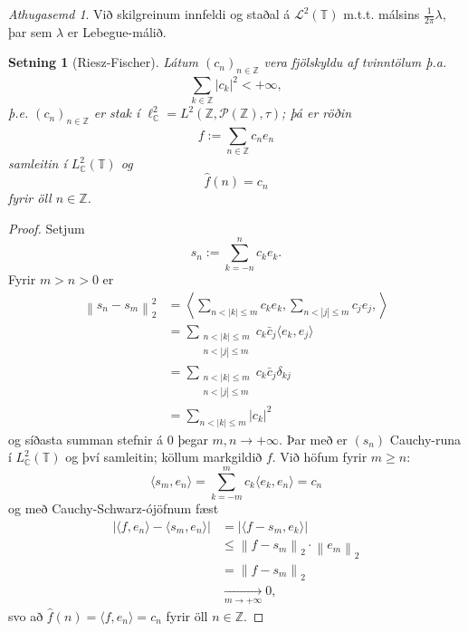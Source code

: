 \documentclass[a4paper,icelandic,11pt]{book}
\theoremstyle{plain}      \newtheorem{setn}{Setning}[chapter]
\theoremstyle{definition} \newtheorem{skilgr}[setn]{Skilgreining}
\theoremstyle{remark}     \newtheorem*{ath}{Athugasemd}
\newcommand{\C}{\mathbb C}
\newcommand{\Z}{\mathbb Z}
\begin{document}
\begin{ath}
  Við skilgreinum innfeldi og staðal á $\mathcal L^{2}(\mathbb T)$
  m.t.t. málsins $\frac{1}{2\pi}\lambda$, þar sem $\lambda$ er
  Lebegue-málið.
\end{ath}
\begin{setn}
  [Riesz-Fischer]
  
  Látum $(c_{n})_{n\in\Z}$ vera fjölskyldu af tvinntölum þ.a. 
  \[
  \sum_{k\in\Z}^{}|c_{k}|^{2} < +\infty,
  \]
  þ.e. $(c_{n})_{n\in\Z}$ er stak í $\ell^{2}_{\C} = L^{2}(\Z,\mathcal
  P(\Z),\tau)$; þá er röðin 
  \[
  f := \sum_{n\in\Z}^{}c_{n}e_{n}
  \]
  samleitin í $L^{2}_{\C}(\mathbb T)$ og 
  \[
  \hat f(n) = c_{n}
  \]
  fyrir öll $n\in\Z$.
\end{setn}
\begin{proof}
  Setjum 
  \[
  s_{n} := \sum_{k=-n}^{n}c_{k}e_{k}.
  \]
  Fyrir $m>n>0$ er
  \begin{align*}
    \left\|
      s_{n} - s_{m}
    \right\|_{2}^{2}
    &=
    \left\langle
      \sum_{n<|k|\le m} c_{k}e_{k}
      ,
      \sum_{n<|j|\le m} c_{j}e_{j},
    \right\rangle
    \\
    &= \sum_{\substack{n<|k|\le m\\ n<|j|\le m}} c_{k}\bar c_{j}
    \langle e_{k},e_{j}\rangle
    \\
    &= \sum_{\substack{n<|k|\le m\\ n<|j|\le m}} c_{k}\bar c_{j}
    \delta_{kj}
    \\
    &= \sum_{n<|k|\le m}|c_{k}|^{2}
  \end{align*}
  og síðasta summan stefnir á 0 þegar $m,n\longrightarrow+\infty$. Þar
  með er $(s_{n})$ Cauchy-runa í $L_{\C}^{2}(\mathbb T)$ og því
  samleitin; köllum markgildið $f$. Við höfum fyrir $m\ge n$: 
  \[
  \langle s_{m},e_{n}\rangle
  = \sum_{k=-m}^{m}c_{k}\langle e_{k},e_{n}\rangle
  = c_{n}
  \]
  og með Cauchy-Schwarz-ójöfnum fæst
  \begin{align*}
    \left|
      \langle f,e_{n}\rangle
      - \langle s_{m},e_{n}\rangle
    \right|
    &= \left|
      \langle f - s_{m},e_{k}\rangle
    \right|
    \\
    &\le \left\|
      f - s_{m}
    \right\|_{2}
    \cdot \left\|
      e_{m}
    \right\|_{2}
    \\
    &= \left\|
      f-s_{m}
    \right\|_{2}
    \\
    &\xrightarrow[m\to+\infty]{} 0,
  \end{align*}
  svo að $\hat f(n) = \langle f,e_{n}\rangle = c_{n}$ fyrir öll
  $n\in\Z$.
\end{proof}
\end{document}
